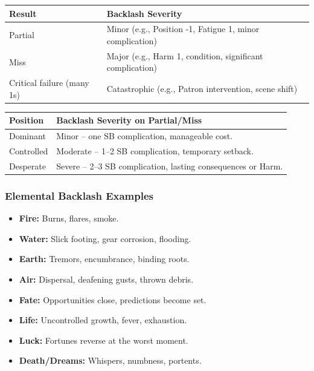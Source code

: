 \begin{center}
\small
\begin{tabular}{ll}
\toprule
\textbf{Result} & \textbf{Backlash Severity} \\
\midrule
Partial & Minor (e.g., Position -1, Fatigue 1, minor complication) \\
Miss & Major (e.g., Harm 1, condition, significant complication) \\
Critical failure (many 1s) & Catastrophic (e.g., Patron intervention, scene shift) \\
\bottomrule
\end{tabular}
\end{center}

\begin{tcolorbox}[title=Backlash Severity by Position, colback=white!97!gray, colframe=black!80!gray,breakable]
\begin{tabular}{ll}
\toprule
\textbf{Position} & \textbf{Backlash Severity on Partial/Miss} \\
\midrule
Dominant & Minor -- one SB complication, manageable cost. \\
Controlled & Moderate -- 1--2 SB complication, temporary setback. \\
Desperate & Severe -- 2--3 SB complication, lasting consequences or Harm. \\
\bottomrule
\end{tabular}
\end{tcolorbox}

\subsubsection*{Elemental Backlash Examples}
\label{sec:elemental-backlash}
\begin{itemize}
  \item \textbf{Fire:} Burns, flares, smoke.
  \item \textbf{Water:} Slick footing, gear corrosion, flooding.
  \item \textbf{Earth:} Tremors, encumbrance, binding roots.
  \item \textbf{Air:} Dispersal, deafening gusts, thrown debris.
  \item \textbf{Fate:} Opportunities close, predictions become set.
  \item \textbf{Life:} Uncontrolled growth, fever, exhaustion.
  \item \textbf{Luck:} Fortunes reverse at the worst moment.
  \item \textbf{Death/Dreams:} Whispers, numbness, portents.
\end{itemize}

